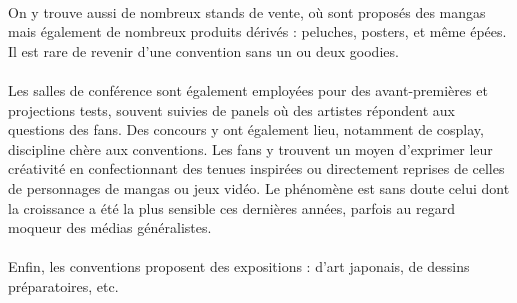 \paragraph{}
On y trouve aussi de nombreux stands de vente, où sont proposés des mangas mais également de nombreux produits dérivés : peluches, posters, et même épées. Il est rare de revenir d’une convention sans un ou deux goodies.
\paragraph{}
Les salles de conférence sont également employées pour des avant-premières et projections tests, souvent suivies de panels où des artistes répondent aux questions des fans. Des concours y ont également lieu, notamment de cosplay, discipline chère aux conventions. Les fans y trouvent un moyen d’exprimer leur créativité en confectionnant des tenues inspirées ou directement reprises de celles de personnages de mangas ou jeux vidéo. Le phénomène est sans doute celui dont la croissance a été la plus sensible ces dernières années, parfois au regard moqueur des médias généralistes.
\paragraph{}
Enfin, les conventions proposent des expositions : d’art japonais, de dessins préparatoires, etc.
